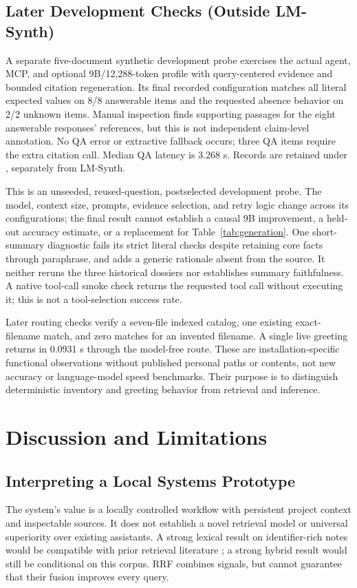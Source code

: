 \documentclass[conference,letterpaper]{IEEEtran}
\begin{document}
\subsection{Later Development Checks (Outside LM-Synth)}
A separate five-document synthetic development probe exercises the actual agent, MCP, and optional 9B/12,288-token profile with query-centered evidence and bounded citation regeneration. Its final recorded configuration matches all literal expected values on 8/8 answerable items and the requested absence behavior on 2/2 unknown items. Manual inspection finds supporting passages for the eight answerable responses' references, but this is not independent claim-level annotation. No QA error or extractive fallback occurs; three QA items require the extra citation call. Median QA latency is 3.268 s. Records are retained under , separately from LM-Synth.

This is an unseeded, reused-question, postselected development probe. The model, context size, prompts, evidence selection, and retry logic change across its configurations; the final result cannot establish a causal 9B improvement, a held-out accuracy estimate, or a replacement for Table~\ref{tab:generation}. One short-summary diagnostic fails its strict literal checks despite retaining core facts through paraphrase, and adds a generic rationale absent from the source. It neither reruns the three historical dossiers nor establishes summary faithfulness. A native tool-call smoke check returns the requested tool call without executing it; this is not a tool-selection success rate.

Later routing checks verify a seven-file indexed catalog, one existing exact-filename match, and zero matches for an invented filename. A single live greeting returns in 0.0931 s through the model-free route. These are installation-specific functional observations without published personal paths or contents, not new accuracy or language-model speed benchmarks. Their purpose is to distinguish deterministic inventory and greeting behavior from retrieval and inference.

\section{Discussion and Limitations}
\subsection{Interpreting a Local Systems Prototype}
The system's value is a locally controlled workflow with persistent project context and inspectable sources. It does not establish a novel retrieval model or universal superiority over existing assistants. A strong lexical result on identifier-rich notes would be compatible with prior retrieval literature \cite{beir}; a strong hybrid result would still be conditional on this corpus. RRF combines signals, but cannot guarantee that their fusion improves every query.
\end{document}
